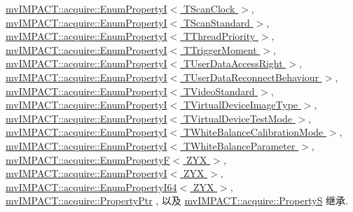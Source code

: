 \hyperlink{classmv_i_m_p_a_c_t_1_1acquire_1_1_enum_property_i}{mv\+I\+M\+P\+A\+C\+T\+::acquire\+::\+Enum\+Property\+I$<$ T\+Scan\+Clock $>$}, \hyperlink{classmv_i_m_p_a_c_t_1_1acquire_1_1_enum_property_i}{mv\+I\+M\+P\+A\+C\+T\+::acquire\+::\+Enum\+Property\+I$<$ T\+Scan\+Standard $>$}, \hyperlink{classmv_i_m_p_a_c_t_1_1acquire_1_1_enum_property_i}{mv\+I\+M\+P\+A\+C\+T\+::acquire\+::\+Enum\+Property\+I$<$ T\+Thread\+Priority $>$}, \hyperlink{classmv_i_m_p_a_c_t_1_1acquire_1_1_enum_property_i}{mv\+I\+M\+P\+A\+C\+T\+::acquire\+::\+Enum\+Property\+I$<$ T\+Trigger\+Moment $>$}, \hyperlink{classmv_i_m_p_a_c_t_1_1acquire_1_1_enum_property_i}{mv\+I\+M\+P\+A\+C\+T\+::acquire\+::\+Enum\+Property\+I$<$ T\+User\+Data\+Access\+Right $>$}, \hyperlink{classmv_i_m_p_a_c_t_1_1acquire_1_1_enum_property_i}{mv\+I\+M\+P\+A\+C\+T\+::acquire\+::\+Enum\+Property\+I$<$ T\+User\+Data\+Reconnect\+Behaviour $>$}, \hyperlink{classmv_i_m_p_a_c_t_1_1acquire_1_1_enum_property_i}{mv\+I\+M\+P\+A\+C\+T\+::acquire\+::\+Enum\+Property\+I$<$ T\+Video\+Standard $>$}, \hyperlink{classmv_i_m_p_a_c_t_1_1acquire_1_1_enum_property_i}{mv\+I\+M\+P\+A\+C\+T\+::acquire\+::\+Enum\+Property\+I$<$ T\+Virtual\+Device\+Image\+Type $>$}, \hyperlink{classmv_i_m_p_a_c_t_1_1acquire_1_1_enum_property_i}{mv\+I\+M\+P\+A\+C\+T\+::acquire\+::\+Enum\+Property\+I$<$ T\+Virtual\+Device\+Test\+Mode $>$}, \hyperlink{classmv_i_m_p_a_c_t_1_1acquire_1_1_enum_property_i}{mv\+I\+M\+P\+A\+C\+T\+::acquire\+::\+Enum\+Property\+I$<$ T\+White\+Balance\+Calibration\+Mode $>$}, \hyperlink{classmv_i_m_p_a_c_t_1_1acquire_1_1_enum_property_i}{mv\+I\+M\+P\+A\+C\+T\+::acquire\+::\+Enum\+Property\+I$<$ T\+White\+Balance\+Parameter $>$}, \hyperlink{classmv_i_m_p_a_c_t_1_1acquire_1_1_enum_property_f}{mv\+I\+M\+P\+A\+C\+T\+::acquire\+::\+Enum\+Property\+F$<$ Z\+Y\+X $>$}, \hyperlink{classmv_i_m_p_a_c_t_1_1acquire_1_1_enum_property_i}{mv\+I\+M\+P\+A\+C\+T\+::acquire\+::\+Enum\+Property\+I$<$ Z\+Y\+X $>$}, \hyperlink{classmv_i_m_p_a_c_t_1_1acquire_1_1_enum_property_i64}{mv\+I\+M\+P\+A\+C\+T\+::acquire\+::\+Enum\+Property\+I64$<$ Z\+Y\+X $>$}, \hyperlink{classmv_i_m_p_a_c_t_1_1acquire_1_1_property_ptr}{mv\+I\+M\+P\+A\+C\+T\+::acquire\+::\+Property\+Ptr} , 以及 \hyperlink{classmv_i_m_p_a_c_t_1_1acquire_1_1_property_s}{mv\+I\+M\+P\+A\+C\+T\+::acquire\+::\+Property\+S} 继承.



